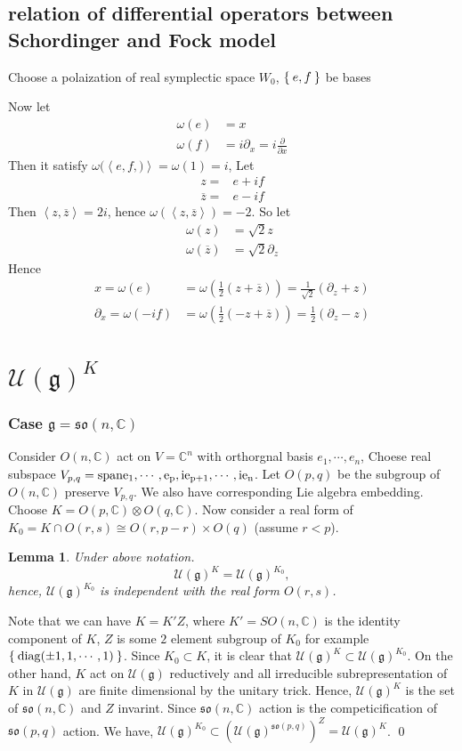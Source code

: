 \documentclass[12pt]{article}
\newtheorem{lemma}{Lemma}
\def\bC{{\mathbb{C}}}
\def\sspan{\rm{span}}
\def\inn#1#2{\left\langle{#1},{#2}\right\rangle}
\def\bz{{\overline{z}}}
\def\aso{\mathfrak{so}}
\def\diag#1{\mathrm{diag}(#1)}
\def\fgg{\mathfrak{g}}
\def\cuu{\mathcal{U}}
\begin{document}
\subsection{relation of differential operators between Schordinger and Fock model}
Choose a polaization of real symplectic space $W_0$, $\Set{e,f}$ be bases

Now let 
\begin{align*}
\omega(e) &=  x\\
\omega(f) &= i\partial_ x = i\frac{\partial}{\partial x}
\end{align*}
Then it satisfy $\omega(\inn{e,f})=\omega(1)=i$, 
Let 
\begin{align*}
z =& e + if\\
\bz =& e -if 
\end{align*}
Then $\inn{z}{\bz}=2i$, hence $\omega(\inn{z}{\bz}) = -2$. 
So let
\begin{align*}
\omega(z) &= \sqrt{2} z \\
\omega(\bz) &=  \sqrt{2} \partial_z
\end{align*}
Hence 
\begin{align*}
x = \omega(e) 
&= \omega(\frac{1}{2}(z+\bz)) = \frac{1}{\sqrt{2}}\left(\partial_z + z\right)\\
\partial_x = \omega(-if) &= \omega(\frac{1}{2}(-z + \bz)) = 
\frac{1}{2}\left(\partial_z -z \right)
\end{align*}

\section{$\cuu(\fgg)^K$}
\subsubsection{Case $\fgg=\aso(n,\bC)$} 
Consider $O(n,\bC)$ act on $V=\bC^n$ with orthorgnal basis $e_1, \cdots, e_n$, 
Choese real subspace $V_{p,q} = \sspan{e_1, \cdots, e_p, ie_{p+1},\cdots, ie_n}$.
Let $O(p,q)$ be the subgroup of $O(n,\bC)$ preserve $V_{p,q}$. We also have corresponding Lie algebra embedding. 
Choose $K = O(p,\bC)\otimes O(q,\bC)$. Now consider a real form of 
$K_0 = K\cap O(r,s) \cong O(r,p-r)\times O(q)$ (assume $r<p$).

\begin{lemma} Under above notation.
\[\cuu(\fgg)^{K} = \cuu(\fgg)^{K_0},\]
hence, $\cuu(\fgg)^{K_0}$ is independent with the real form $O(r,s)$. 
\end{lemma}
\proof Note that we can have $K=K'Z$, where $K' = SO(n,\bC)$ is the identity component of
 $K$, $Z$ is some $2$ element subgroup of $K_0$ 
for example $\Set{\diag{\pm 1,1, \cdots, 1}}$. Since $K_0\subset K$, 
it is clear that $\cuu(\fgg)^K\subset \cuu(\fgg)^{K_0}$.
On the other hand, $K$ act on $\cuu(\fgg)$ reductively
and all irreducible subrepresentation of $K$ in $\cuu(\fgg)$ 
are finite dimensional by the unitary trick. Hence, 
$\cuu(\fgg)^K$ is the set of $\aso(n,\bC)$ and $Z$ invarint.
Since $\aso(n,\bC)$ action is the competicification of $\aso(p,q)$ action.
We have, $\cuu(\fgg)^{K_0} \subset (\cuu(\fgg)^{\aso(p,q)})^Z = \cuu(\fgg)^K$.
\qed
\end{document}
